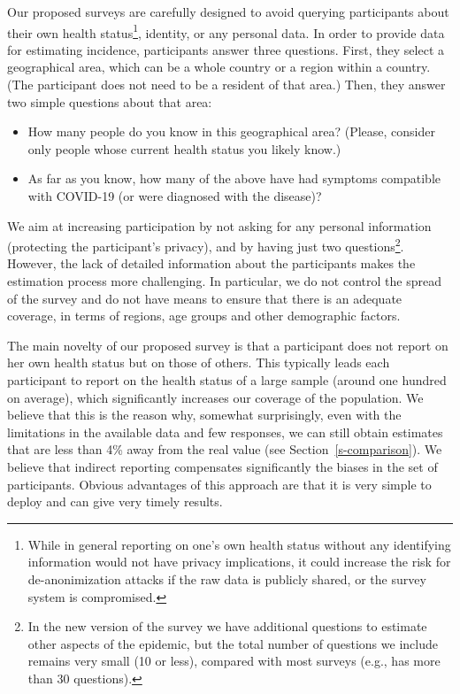 \documentclass{article}
\newcommand{\af}[1]{{#1}}
\begin{document}
Our proposed surveys are carefully designed to avoid querying participants about their own health status\footnote{While in general reporting on one's own health status without any identifying information would not have privacy implications, it could increase the risk for de-anonimization attacks if the raw data is publicly shared, or the survey system is compromised.}, identity, or any personal data. In order to provide data for estimating incidence, participants answer three questions. First, they select a geographical area, which can be a whole country or a region within a country. (The participant does not need to be a resident of that area.)  Then, they answer two simple questions about that area: 
\begin{itemize}
\item How many people do you know in this geographical area? (Please, consider only people whose current health status you likely know.)
\item As far as you know, how many of the above have had symptoms compatible with COVID-19 (or were diagnosed with the disease)?
\end{itemize}

We aim at increasing participation by not asking for any personal information (protecting the participant's privacy), and by having just two questions\footnote{In the new version of the survey we have additional questions to estimate other aspects of the epidemic, but the total number of questions we include remains very small (10 or less), compared with most surveys (e.g., \cite{FB-survey} has more than 30 questions).}. However, the lack of detailed information about the participants makes the estimation process more challenging. In particular, we do not control the spread of the survey and do not have means to ensure that there is an adequate coverage, in terms of regions, age groups and other demographic factors. 

The main novelty of our proposed survey is that a participant does not report on her own health status but on those of others. This typically leads each participant to report on the health status of a large sample (around one hundred on average), which significantly increases our coverage of the population. We believe that this is the reason why, 
somewhat surprisingly, even with the limitations in the available data and few responses, we can still obtain estimates that are less than 4\% away from the real value (see Section~\ref{s-comparison}). 
\af{We believe that indirect reporting compensates significantly the biases in the set of participants.}
Obvious advantages of this approach are that it is very simple to deploy and can give very timely results.
\end{document}
